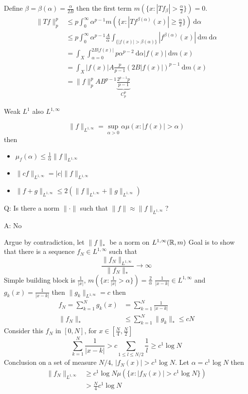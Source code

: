 Define $\beta = \beta(\alpha) = \frac{\alpha}{2B}$ then the first term $m(\{x : |Tf_\beta| > \frac\alpha2\}) = 0$. 
\begin{align*}
  \|Tf\|_p^p &\le p\int_0^\infty \alpha^{p-1} m(\{x : |Tf^{\beta(\alpha)}(x)| \ge \frac\alpha2\}) \ \mathrm{d}\alpha \\
  &\le p\int_0^\infty \alpha^{p-1} \frac{A}\alpha \int_{\{|f(x)| > \beta(\alpha)\}} |f^{\beta(\alpha)}(x)| \ \mathrm{d}m \ \mathrm{d}\alpha \\
  &= \int_X\int_{\alpha=0}^{2B|f(x)|} p\alpha^{p-2} \ \mathrm{d}\alpha |f(x)| \ \mathrm{d}m(x) \\
  &= \int_X |f(x)| A\frac p{p-1}(2B |f(x)|)^{p-1} \ \mathrm{d}m(x) \\
  &= \|f\|_p^p AB^{p-1} \underbrace{\frac{2^{p-1}p}{p-1}}_{C_p^p}
\end{align*}

Weak $L^1$ also $L^{1, \infty}$

\[\|f\|_{L^{1, \infty}} = \sup_{\alpha > 0} \alpha \mu({x : |f(x)| > \alpha})\]
then 
\begin{itemize}
  \item $\mu_f(\alpha) \le \frac1\alpha\|f\|_{L^{1, \infty}}$
  \item $\|cf\|_{L^{1, \infty}} = |c|\|f\|_{L^{1, \infty}}$
  \item $\|f + g\|_{L^{1, \infty}} \le 2(\|f\|_{L^{1, \infty}} + \|g\|_{L^{1, \infty}})$
\end{itemize}

Q: Is there a norm $\|\cdot\|$ such that $\|f\| \approx \|f\|_{L^{1, \infty}}$?

A: No

Argue by contradiction, let $\|f\|_*$ be a norm on $L^{1, \infty}(\mathbb R, m)$
Goal is to show that there is a sequence $f_{N} \in L^{1, \infty}$ such that
\[ \frac{\|f_N\|_{L^{1, \infty}}}{\|f_N\|_*}\to \infty\]
Simple building block is $\frac1{|x|}$, $m\left(\{x : \frac1{|x|} > \alpha\}\right) = \frac2\alpha$
$\frac1{|x-k|} \in L^{1, \infty}$ and $g_k(x)= \frac{1}{|x-k|}$ then
$\|g_k\|_{L^{1, \infty}} = c$ then
\begin{align*}
  f_N = \sum_{k=1}^N g_k(x) &= \sum_{k=1}^N \frac1{|x-k|} \\
  \|f_N\|_* &\le \sum_{k=1}^N \|g_k\|_* \le cN
\end{align*}
Consider this $f_N$ in $[0, N]$, for $x \in [\frac N4, \frac N2]$
\[\sum_{k=1}^N \frac1{|x-k|} > c\sum_{1 \le l \le N/2} \frac 1l \ge c^1 \log N\]
Conclusion on a set of measure $N/4$, $|f_N(x)| > c^1 \log N$.
Let $\alpha = c^1 \log N$ then 
\begin{align*}
  \|f_N\|_{L^{1, \infty}} &\ge c^1 \log N \mu(\{x : |f_N(x)| > c^1 \log N\}) \\
  &> \frac{N}4 c^1 \log N
\end{align*}

